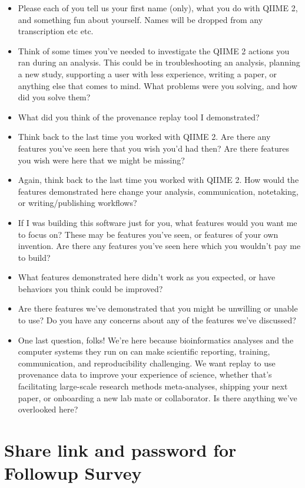 \begin{itemize}
    \item Please each of you tell us your first name (only), what you do with QIIME 2, and something fun about yourself. Names will be dropped from any transcription etc etc.
    \item Think of some times you’ve needed to investigate the QIIME 2 actions you ran during an analysis. This could be in troubleshooting an analysis, planning a new study, supporting a user with less experience, writing a paper, or anything else that comes to mind. What problems were you solving, and how did you solve them?
    \item What did you think of the provenance replay tool I demonstrated?
    \item Think back to the last time you worked with QIIME 2. Are there any features you’ve seen here that you wish you’d had then? Are there features you wish were here that we might be missing?
    \item Again, think back to the last time you worked with QIIME 2. How would the features demonstrated here change your analysis, communication, notetaking, or writing/publishing workflows?
    \item If I was building this software just for you, what features would you want me to focus on? These may be features you’ve seen, or features of your own invention. Are there any features you’ve seen here which you wouldn’t pay me to build?
    \item What features demonstrated here didn’t work as you expected, or have behaviors you think could be improved?
    \item Are there features we’ve demonstrated that you might be unwilling or unable to use? Do you have any concerns about any of the features we’ve discussed?
    \item One last question, folks! We’re here because bioinformatics analyses and the computer systems they run on can make scientific reporting, training, communication, and reproducibility challenging. We want replay to use provenance data to improve your experience of science, whether that’s facilitating large-scale research methods meta-analyses, shipping your next paper, or onboarding a new lab mate or collaborator. Is there anything we’ve overlooked here?
\end{itemize}

\section*{Share link and password for Followup Survey}